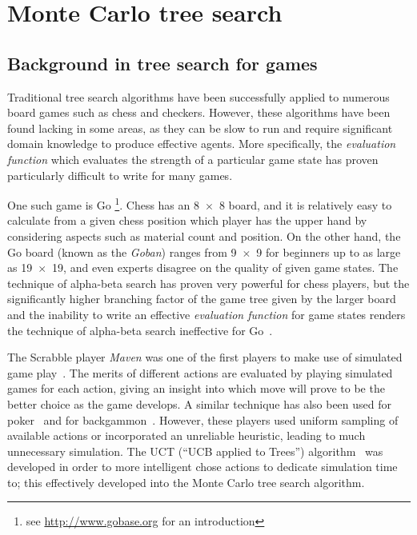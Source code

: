 \section{Monte Carlo tree search}

\subsection{Background in tree search for games}

Traditional tree search algorithms have been successfully applied to numerous board games such as chess and checkers.  However, these algorithms have been found lacking in some areas, as they can be slow to run and require significant domain knowledge to produce effective agents.  More specifically, the \emph{evaluation function} which evaluates the strength of a particular game state has proven particularly difficult to write for many games.

One such game is Go \footnote{see \url{http://www.gobase.org} for an introduction}.  Chess has an 8~$\times$~8 board, and it is relatively easy to calculate from a given chess position which player has the upper hand by considering aspects such as material count and position.  On the other hand, the Go board (known as the \emph{Goban}) ranges from 9~$\times$~9 for beginners up to as large as 19~$\times$~19, and even experts disagree on the quality of given game states.  The technique of alpha-beta search  has proven very powerful for chess players, but the significantly higher branching factor of the game tree given by the larger board and the inability to write an effective \emph{evaluation function} for game states renders the technique of alpha-beta search ineffective for Go~\citep{Gelly2006}.

The Scrabble player \emph{Maven} was one of the first players to make use of simulated game play~\citep{Sheppard2002}.  The merits of different actions are evaluated by playing simulated games for each action, giving an insight into which move will prove to be the better choice as the game develops.  A similar technique has also been used for poker~\citep{Billings2002} and for backgammon~\citep{Tesauro1996}.  However, these players used uniform sampling of available actions or incorporated an unreliable heuristic, leading to much unnecessary simulation.  The UCT (``UCB applied to Trees'') algorithm~\citep{Kocsis2006} was developed in order to more intelligent chose actions to dedicate simulation time to; this effectively developed into the Monte Carlo tree search algorithm.

